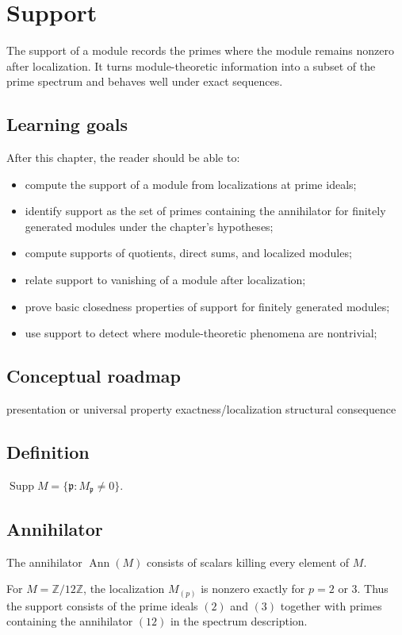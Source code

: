 \chapter{Support}
\label{ch:v16}

The support of a module records the primes where the module remains nonzero after localization. It turns module-theoretic information into a subset of the prime spectrum and behaves well under exact sequences.

\section*{Learning goals}
After this chapter, the reader should be able to:
\begin{itemize}
\item compute the support of a module from localizations at prime ideals;
\item identify support as the set of primes containing the annihilator for finitely generated modules under the chapter's hypotheses;
\item compute supports of quotients, direct sums, and localized modules;
\item relate support to vanishing of a module after localization;
\item prove basic closedness properties of support for finitely generated modules;
\item use support to detect where module-theoretic phenomena are nontrivial;
\end{itemize}
\section*{Conceptual roadmap}
\volroadmap
  {presentation or universal property}
  {exactness/localization}
  {structural consequence}

\section{Definition}
$\operatorname{Supp}M=\{\mathfrak p:M_{\mathfrak p}\ne0\}$.

\section{Annihilator}
The annihilator $\operatorname{Ann}(M)$ consists of scalars killing every element of $M$.

\begin{example}\label{ex:v16-expand-01}
For $M=\mathbb Z/12\mathbb Z$, the localization $M_{(p)}$ is nonzero exactly for $p=2$ or $3$. Thus the support consists of the prime ideals $(2)$ and $(3)$ together with primes containing the annihilator $(12)$ in the spectrum description.
\end{example}
